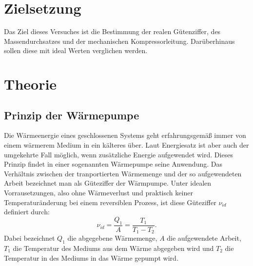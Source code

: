 \section{Zielsetzung}
Das Ziel dieses Versuches ist die Bestimmung der realen Gütenziffer,
des Massendurchsatzes und der mechanischen Kompressorleitung. Darüberhinaus
sollen diese mit ideal Werten verglichen werden.
\section{Theorie}
\label{sec:Theorie}
\subsection{Prinzip der Wärmepumpe}
Die Wärmeenergie eines geschlossenen Systems geht erfahrungsgemäß immer von
einem wärmerem Medium in ein kälteres über. Laut Energiesatz ist aber auch der
umgekehrte Fall möglich, wenn zusätzliche Energie aufgewendet wird.
Dieses Prinzip findet in einer sogenannten Wärmepumpe seine Anwendung.
Das Verhältnis zwischen der tranportierten Wärmemenge und der so aufgewendeten
Arbeit bezeichnet man als Güteziffer der Wärmpumpe. Unter idealen Vorrausetzungen,
also ohne Wärmeverlust und praktisch keiner Temperaturänderung bei einem
reversiblen Prozess, ist diese Güteziffer $\nu_{id}$ definiert durch:
\begin{equation}
  \nu_{id} = \frac{Q_1}{A} = \frac{T_1}{T_1 - T_2}.
  \label{eqn:idgüte}
\end{equation}
Dabei bezeichnet $Q_1$ die abgegebene Wärmemenge, $A$ die aufgewendete Arbeit,
$T_1$ die Temperatur des Mediums aus dem Wärme abgegeben wird und $T_2$ die
Temperatur in des Mediums in das Wärme gepumpt wird.
